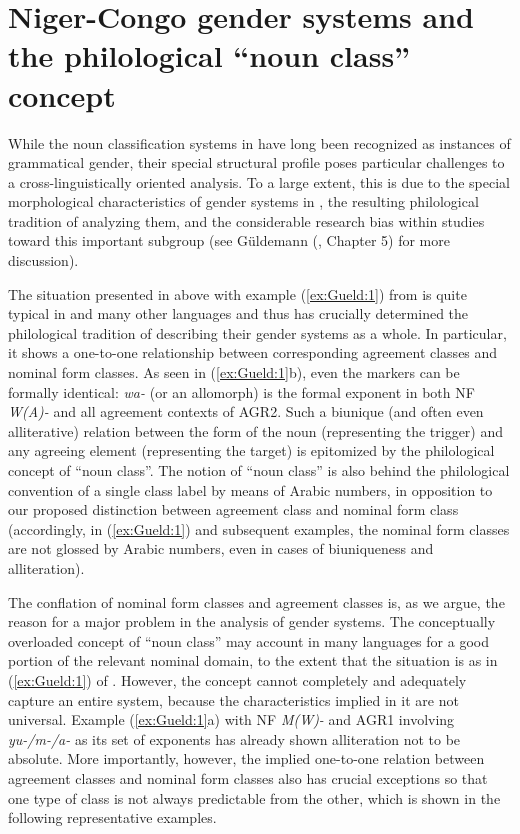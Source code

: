 \documentclass[output=collectionpaper]{langsci/langscibook}
\begin{document}
\section{Niger-Congo gender systems and the philological ``noun class'' concept}
\label{sec:Gueld:2}

While the noun classification systems in  have long been recognized as instances of grammatical gender, their special structural profile poses particular challenges to a cross-linguistically oriented analysis. To a large extent, this is due to the special morphological characteristics of gender systems in , the resulting philological tradition of analyzing them, and the considerable research bias within  studies toward this important subgroup (see Güldemann (\citeyear{Gueldemann2018}, Chapter 5) for more discussion).

The situation presented in  above with example (\ref{ex:Gueld:1}) from  is quite typical in  and many other  languages and thus has crucially determined the philological tradition of describing their gender systems as a whole. In particular, it shows a one-to-one relationship between corresponding agreement classes and nominal form classes. As seen in (\ref{ex:Gueld:1}b), even the markers can be formally identical: \textit{wa-} (or an allomorph) is the formal exponent in both NF \textit{W(A)-} and all agreement contexts of AGR2. Such a biunique (and often even alliterative) relation between the form of the noun (representing the trigger) and any agreeing element (representing the target) is epitomized by the philological concept of ``noun class''. The notion of ``noun class'' is also behind the philological convention of a single class label by means of Arabic numbers, in opposition to our proposed distinction between agreement class and nominal form class (accordingly, in (\ref{ex:Gueld:1}) and subsequent  examples, the nominal form classes are not glossed by Arabic numbers, even in cases of biuniqueness and alliteration).

The conflation of nominal form classes and agreement classes is, as we argue, the reason for a major problem in the analysis of  gender systems. The conceptually overloaded concept of ``noun class'' may account in many languages for a good portion of the relevant nominal domain, to the extent that the situation is as in (\ref{ex:Gueld:1}) of . However, the concept cannot completely and adequately capture an entire system, because the characteristics implied in it are not universal. Example (\ref{ex:Gueld:1}a) with NF \textit{M(W)-} and AGR1 involving \textit{yu-/m-/a-} as its set of exponents has already shown alliteration not to be absolute. More importantly, however, the implied one-to-one relation between agreement classes and nominal form classes also has crucial exceptions so that one type of class is not always predictable from the other, which is shown in the following representative examples.
\end{document}
